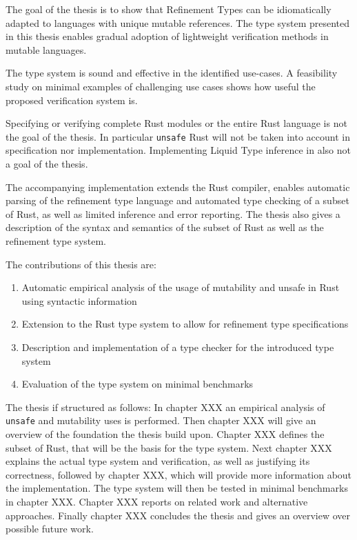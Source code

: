 \documentclass{book}
\newcommand{\code}[1]{\texttt{#1}}
\theoremstyle{definition}
\begin{document}
The goal of the thesis is to show that Refinement Types can be idiomatically adapted to languages with unique mutable references. The type system presented in this thesis enables gradual adoption of lightweight verification methods in mutable languages.

The type system is sound and effective in the identified use-cases.
A feasibility study on minimal examples of challenging use cases shows how useful the proposed verification system is. 

Specifying or verifying complete Rust modules or the entire Rust language is not the goal of the thesis. In particular \code{unsafe} Rust will not be taken into account in specification nor implementation. Implementing Liquid Type inference in also not a goal of the thesis.

The accompanying implementation extends the Rust compiler, enables automatic parsing of the refinement type language and automated type checking of a subset of Rust, as well as limited inference and error reporting. 
The thesis also gives a description of the syntax and semantics of the subset of Rust as well as the refinement type system.

The contributions of this thesis are:
\begin{enumerate}
  \item Automatic empirical analysis of the usage of mutability and unsafe in Rust using syntactic information
  \item Extension to the Rust type system to allow for refinement type specifications
  \item Description and implementation of a type checker for the introduced type system
  \item Evaluation of the type system on minimal benchmarks
\end{enumerate}

The thesis if structured as follows: 
In chapter XXX an empirical analysis of \code{unsafe} and mutability uses is performed. 
Then chapter XXX will give an overview of the foundation the thesis build upon. 
Chapter XXX defines the subset of Rust, that will be the basis for the type system.
Next chapter XXX explains the actual type system and verification, as well as justifying its correctness, followed by chapter XXX, which will provide more information about the implementation.
The type system will then be tested in minimal benchmarks in chapter XXX.
Chapter XXX reports on related work and alternative approaches.
Finally chapter XXX concludes the thesis and gives an overview over possible future work.
\end{document}
